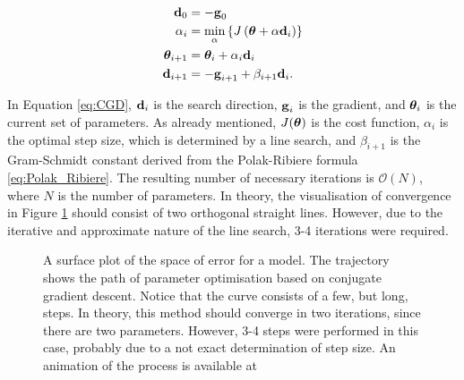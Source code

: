 \begin{align}\label{eq:CGD}
    \begin{split}
        \bm{\mathrm{d}}_{0}        & = - \bm{\mathrm{g}}_{0}                                                    \\
        \alpha_{i}        & = \min_{\alpha} \left\{  J\left(\mathrm{\boldsymbol{\theta}} + \alpha \bm{\mathrm{d}}_{i} \right) \right\} \\
        \mathrm{\boldsymbol{\theta}}_{i+1} & = \mathrm{\boldsymbol{\theta}}_{i} + \alpha_{i} \bm{\mathrm{d}}_{i}                         \\
        \bm{\mathrm{d}}_{i+1}      & = -\bm{\mathrm{g}}_{i+1} + \beta_{i+1} \bm{\mathrm{d}}_{i}.                          \\
    \end{split}
\end{align}

In Equation \eqref{eq:CGD}, $\bm{\mathrm{d}}_{i}$ is the search direction, $\bm{\mathrm{g}}_{i}$ is the gradient, and $\mathrm{\boldsymbol{\theta}}_{i}$ is the current set of parameters.
As already mentioned, $J(\mathrm{\boldsymbol{\theta}})$ is the cost function, $\alpha_{i}$ is the optimal step size, which is determined by a line search, and $\beta_{i+1}$ is the Gram-Schmidt constant derived from the Polak-Ribiere formula \eqref{eq:Polak_Ribiere}.
The resulting number of necessary iterations is $\mathcal{O}(N)$, where $N$ is the number of parameters.
In theory, the visualisation of convergence in Figure \ref{fig:CGD_surface} should consist of two orthogonal straight lines.
However, due to the iterative and approximate nature of the line search, 3-4 iterations were required.

\begin{figure}[h!]
    \centering
    
    \caption{A surface plot of the space of error for a model.
        The trajectory shows the path of parameter optimisation based on conjugate gradient descent.
        Notice that the curve consists of a few, but long, steps.
        In theory, this method should converge in two iterations, since there are two parameters.
        However, 3-4 steps were performed in this case, probably due to a not exact determination of step size.
        An animation of the process is available at %
    }
    \label{fig:CGD_surface}
\end{figure}


